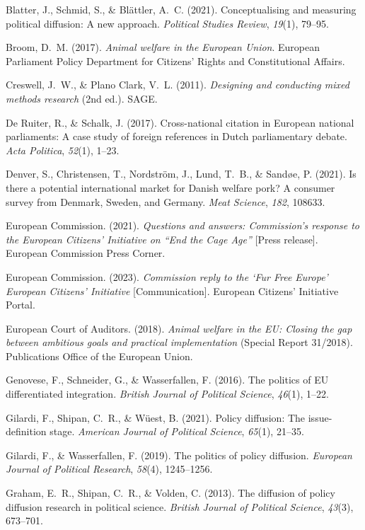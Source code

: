 \documentclass[twocolumn, 10pt, a4paper]{article}
\begin{document}
\noindent Blatter, J., Schmid, S., \& Bl\"attler, A.~C. (2021). Conceptualising and
measuring political diffusion: A new approach. \textit{Political Studies Review},
\textit{19}(1), 79--95.

\noindent Broom, D.~M. (2017). \textit{Animal welfare in the European Union}.
European Parliament Policy Department for Citizens' Rights and Constitutional
Affairs.

\noindent Creswell, J.~W., \& Plano Clark, V.~L. (2011). \textit{Designing and
conducting mixed methods research} (2nd ed.). SAGE.

\noindent De Ruiter, R., \& Schalk, J. (2017). Cross-national citation in European
national parliaments: A case study of foreign references in Dutch parliamentary
debate. \textit{Acta Politica}, \textit{52}(1), 1--23.

\noindent Denver, S., Christensen, T., Nordstr\"{o}m, J., Lund, T.~B., \&
Sand\o{}e, P. (2021). Is there a potential international market for Danish welfare
pork? A consumer survey from Denmark, Sweden, and Germany. \textit{Meat Science},
\textit{182}, 108633.

\noindent European Commission. (2021). \textit{Questions and answers: Commission's
response to the European Citizens' Initiative on ``End the Cage Age''} [Press
release]. European Commission Press Corner.

\noindent European Commission. (2023). \textit{Commission reply to the `Fur Free
Europe' European Citizens' Initiative} [Communication]. European Citizens'
Initiative Portal.

\noindent European Court of Auditors. (2018). \textit{Animal welfare in the EU:
Closing the gap between ambitious goals and practical implementation} (Special Report
31/2018). Publications Office of the European Union.

\noindent Genovese, F., Schneider, G., \& Wasserfallen, F. (2016). The politics of
EU differentiated integration. \textit{British Journal of Political Science},
\textit{46}(1), 1--22.

\noindent Gilardi, F., Shipan, C.~R., \& W\"{u}est, B. (2021). Policy diffusion:
The issue-definition stage. \textit{American Journal of Political Science},
\textit{65}(1), 21--35.

\noindent Gilardi, F., \& Wasserfallen, F. (2019). The politics of policy diffusion.
\textit{European Journal of Political Research}, \textit{58}(4), 1245--1256.

\noindent Graham, E.~R., Shipan, C.~R., \& Volden, C. (2013). The diffusion of
policy diffusion research in political science. \textit{British Journal of Political
Science}, \textit{43}(3), 673--701.
\end{document}
